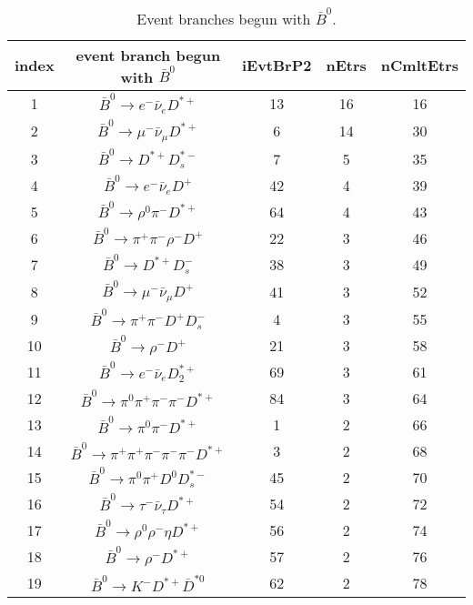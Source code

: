\documentclass[landscape]{article}
\begin{document}
\begin{table}[htbp!]
\caption{Event branches begun with $ \bar{B}^{0} $.}
\small
\centering
\begin{tabular}{|c|c|c|c|c|}
\hline
index & event branch begun with $ \bar{B}^{0} $ & iEvtBrP2 & nEtrs & nCmltEtrs \\
\hline
1 & $ \bar{B}^{0} \rightarrow e^{-} \bar{\nu}_{e} D^{*+} $ & 13 & 16 & 16 \\
\hline
2 & $ \bar{B}^{0} \rightarrow \mu^{-} \bar{\nu}_{\mu} D^{*+} $ & 6 & 14 & 30 \\
\hline
3 & $ \bar{B}^{0} \rightarrow D^{*+} D_{s}^{*-} $ & 7 & 5 & 35 \\
\hline
4 & $ \bar{B}^{0} \rightarrow e^{-} \bar{\nu}_{e} D^{+} $ & 42 & 4 & 39 \\
\hline
5 & $ \bar{B}^{0} \rightarrow \rho^{0} \pi^{-} D^{*+} $ & 64 & 4 & 43 \\
\hline
6 & $ \bar{B}^{0} \rightarrow \pi^{+} \pi^{-} \rho^{-} D^{+} $ & 22 & 3 & 46 \\
\hline
7 & $ \bar{B}^{0} \rightarrow D^{*+} D_{s}^{-} $ & 38 & 3 & 49 \\
\hline
8 & $ \bar{B}^{0} \rightarrow \mu^{-} \bar{\nu}_{\mu} D^{+} $ & 41 & 3 & 52 \\
\hline
9 & $ \bar{B}^{0} \rightarrow \pi^{+} \pi^{-} D^{+} D_{s}^{-} $ & 4 & 3 & 55 \\
\hline
10 & $ \bar{B}^{0} \rightarrow \rho^{-} D^{+} $ & 21 & 3 & 58 \\
\hline
11 & $ \bar{B}^{0} \rightarrow e^{-} \bar{\nu}_{e} D_{2}^{*+} $ & 69 & 3 & 61 \\
\hline
12 & $ \bar{B}^{0} \rightarrow \pi^{0} \pi^{+} \pi^{-} \pi^{-} D^{*+} $ & 84 & 3 & 64 \\
\hline
13 & $ \bar{B}^{0} \rightarrow \pi^{0} \pi^{-} D^{*+} $ & 1 & 2 & 66 \\
\hline
14 & $ \bar{B}^{0} \rightarrow \pi^{+} \pi^{+} \pi^{-} \pi^{-} \pi^{-} D^{*+} $ & 3 & 2 & 68 \\
\hline
15 & $ \bar{B}^{0} \rightarrow \pi^{0} \pi^{+} D^{0} D_{s}^{*-} $ & 45 & 2 & 70 \\
\hline
16 & $ \bar{B}^{0} \rightarrow \tau^{-} \bar{\nu}_{\tau} D^{*+} $ & 54 & 2 & 72 \\
\hline
17 & $ \bar{B}^{0} \rightarrow \rho^{0} \rho^{-} \eta D^{*+} $ & 56 & 2 & 74 \\
\hline
18 & $ \bar{B}^{0} \rightarrow \rho^{-} D^{*+} $ & 57 & 2 & 76 \\
\hline
19 & $ \bar{B}^{0} \rightarrow K^{-} D^{*+} \bar{D}^{*0} $ & 62 & 2 & 78 \\

\end{tabular}
\end{table}
\end{document}
